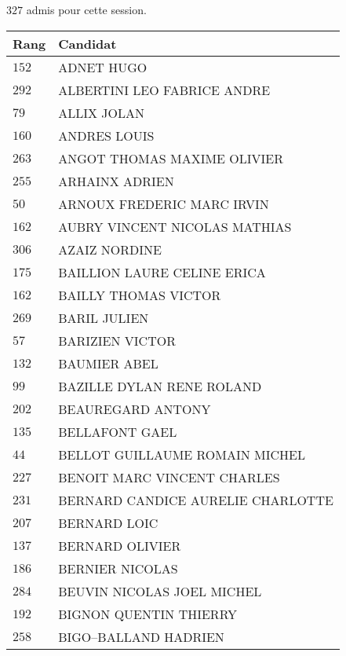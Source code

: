 



  $327$ admis pour cette session.

  \begin{xltabular}{\linewidth}{|l|X|}
    \hline
    \textbf{Rang} & \textbf{Candidat} \\
    \hline
    $152$ & ADNET HUGO \\
    \hline
    $292$ & ALBERTINI LEO FABRICE ANDRE \\
    \hline
    $79$ & ALLIX JOLAN \\
    \hline
    $160$ & ANDRES LOUIS \\
    \hline
    $263$ & ANGOT THOMAS MAXIME OLIVIER \\
    \hline
    $255$ & ARHAINX ADRIEN \\
    \hline
    $50$ & ARNOUX FREDERIC MARC IRVIN \\
    \hline
    $162$ & AUBRY VINCENT NICOLAS MATHIAS \\
    \hline
    $306$ & AZAIZ NORDINE \\
    \hline
    $175$ & BAILLION LAURE CELINE ERICA \\
    \hline
    $162$ & BAILLY THOMAS VICTOR \\
    \hline
    $269$ & BARIL JULIEN \\
    \hline
    $57$ & BARIZIEN VICTOR \\
    \hline
    $132$ & BAUMIER ABEL \\
    \hline
    $99$ & BAZILLE DYLAN RENE ROLAND \\
    \hline
    $202$ & BEAUREGARD ANTONY \\
    \hline
    $135$ & BELLAFONT GAEL \\
    \hline
    $44$ & BELLOT GUILLAUME ROMAIN MICHEL \\
    \hline
    $227$ & BENOIT MARC VINCENT CHARLES \\
    \hline
    $231$ & BERNARD CANDICE AURELIE CHARLOTTE \\
    \hline
    $207$ & BERNARD LOIC \\
    \hline
    $137$ & BERNARD OLIVIER \\
    \hline
    $186$ & BERNIER NICOLAS \\
    \hline
    $284$ & BEUVIN NICOLAS JOEL MICHEL \\
    \hline
    $192$ & BIGNON QUENTIN THIERRY \\
    \hline
    $258$ & BIGO--BALLAND HADRIEN \\

\end{xltabular}
